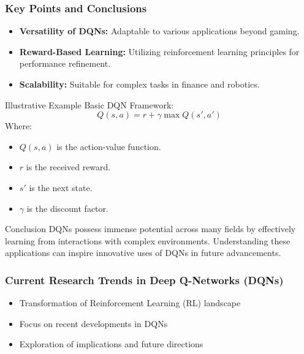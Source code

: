 \documentclass[aspectratio=169]{beamer}
\begin{document}
\begin{frame}[fragile]
    \frametitle{Key Points and Conclusions}
    \begin{itemize}
        \item \textbf{Versatility of DQNs:} Adaptable to various applications beyond gaming.
        \item \textbf{Reward-Based Learning:} Utilizing reinforcement learning principles for performance refinement.
        \item \textbf{Scalability:} Suitable for complex tasks in finance and robotics.
    \end{itemize}
    
    \begin{block}{Illustrative Example}
        Basic DQN Framework:
        \begin{equation}
            Q(s, a) = r + \gamma \max Q(s', a')
        \end{equation}
        Where:
        \begin{itemize}
            \item $Q(s, a)$ is the action-value function.
            \item $r$ is the received reward.
            \item $s'$ is the next state.
            \item $\gamma$ is the discount factor.
        \end{itemize}
    \end{block}
    
    \begin{block}{Conclusion}
        DQNs possess immense potential across many fields by effectively learning from interactions with complex environments. Understanding these applications can inspire innovative uses of DQNs in future advancements.
    \end{block}
\end{frame}

\begin{frame}[fragile]
    \frametitle{Current Research Trends in Deep Q-Networks (DQNs)}
    \begin{itemize}
        \item Transformation of Reinforcement Learning (RL) landscape
        \item Focus on recent developments in DQNs
        \item Exploration of implications and future directions
    \end{itemize}
\end{frame}
\end{document}
